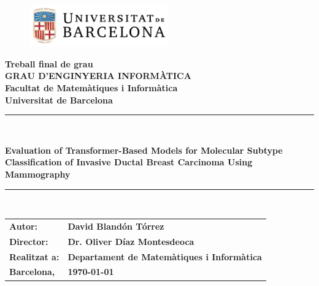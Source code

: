\documentclass[a4paper,10pt]{book}
\begin{document}
\pagestyle{empty}

\begin{titlepage}
	\begin{center}
		\begin{figure}[htb]
			\begin{center}
				\includegraphics[width=6cm]{assets/ub_color.pdf}
			\end{center}
		\end{figure}
				
		\def\worktitle{Development of an AI-Based Tool for Molecular Subtype Classification of Invasive Ductal Breast Carcinoma Using Mammography}
				
		\textbf{\LARGE Treball final de grau} \\
		\vspace*{.5cm}
		\textbf{\LARGE GRAU D'ENGINYERIA INFORM\`{A}TICA } \\
		\vspace*{.5cm}
		\textbf{\LARGE Facultat de Matem\`atiques i Inform\`atica\\ Universitat de Barcelona} \\
		\vspace*{1.0cm}
		\rule{16cm}{0.1mm}\\
		\begin{Huge}
			\textbf{Evaluation of Transformer-Based Models for Molecular Subtype Classification of Invasive Ductal Breast Carcinoma Using Mammography} \\
		\end{Huge}
		\rule{16cm}{0.1mm}\\
				
		\vspace{1cm}
				
		\begin{flushright}
						
						
			\vspace*{2.5cm}
						
			\hfill
						
			\renewcommand{\arraystretch}{1.5}
			\begin{tabular}{ll}
				\textbf{\small Autor:}       & \textbf{\small David Bland\'on T\'orrez }                             \\
				\textbf{\small Director:}    & \textbf{\small Dr. Oliver D\'iaz Montesdeoca }                        \\
				\textbf{\small Realitzat a:} & \textbf{\small  Departament de Matem\`{a}tiques i  Inform\`{a}tica  } \\
				\textbf{\small Barcelona,}   & \textbf{\small \today }                                               
			\end{tabular}
						
		\end{flushright}
				
	\end{center}
		
\end{titlepage}
\end{document}
